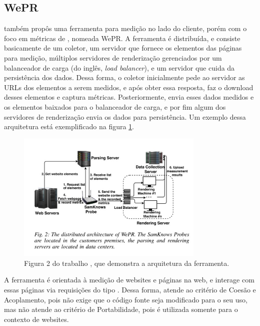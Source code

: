 \documentclass[12pt]{tcc}
\begin{document}
	\subsection{WePR}
	\label{WePR}
	\par \citet{Asrese2019MeasuringWL} também propôs uma ferramenta para medição no lado do cliente, porém com o foco em métricas de , nomeada WePR. A ferramenta é distribuída, e consiste basicamente de um coletor, um servidor que fornece os elementos das páginas para medição, múltiplos servidores de renderização gerenciados por um balanceador de carga (do inglês, \emph{load balancer}), e um servidor que cuida da persistência dos dados. Dessa forma, o coletor inicialmente pede ao servidor as URLs dos elementos a serem medidos, e após obter essa resposta, faz o download desses elementos e captura métricas. Posteriormente, envia esses dados medidos e os elementos baixados para o balanceador de carga, e por fim algum dos servidores de renderização envia os dados para persistência. Um exemplo dessa arquitetura está exemplificado na figura \ref{fig:wepr}.

	\begin{figure}[!ht]
		\centering
		\includegraphics[width=0.8\textwidth]{figures/wepr.jpeg}
		\caption[Fluxo da ferramenta WePR]{Figura 2 do trabalho \citep{Asrese2019MeasuringWL}, que demonstra a arquitetura da ferramenta. }
		\label{fig:wepr}
	\end{figure}

	A ferramenta é orientada à medição de websites e páginas na web, e interage com essas páginas via requisições do tipo . Dessa forma, atende ao critério de Coesão e Acoplamento, pois não exige que o código fonte seja modificado para o seu uso, mas não atende ao critério de Portabilidade, pois é utilizada somente para o contexto de websites.
\end{document}
